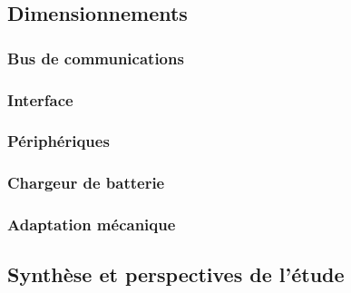 \subsection{Dimensionnements} \label{ssec:Dev-Dimensionnements}

\subsubsection{Bus de communications} \label{sssec:Dev-BusComm}

\subsubsection{Interface} \label{sssec:Interface}

\subsubsection{Périphériques} \label{sssec:Peripheriques}

\subsubsection{Chargeur de batterie} \label{sssec:Chargeur-bat}

\subsubsection{Adaptation mécanique} \label{sssec:Adaptation-mech}

\subsection{Synthèse et perspectives de l'étude} \label{ssec:Synth-etude}